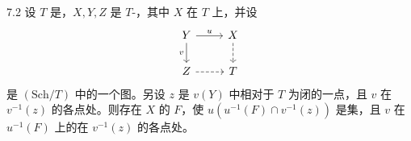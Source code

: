 \begin{SGAresult}{}{7.2}
设 $T$ 是，$X,Y,Z$ 是 $T$-，其中 $X$ 在 $T$ 上，并设
\[
\begin{tikzcd}
Y\arrow[r,"u"]\arrow[d,"v"']&X\arrow[d,dashed]\\
Z\arrow[r,dashed]&T
\end{tikzcd}
\]
是 $(\mathrm{Sch}/T)$ 中的一个图。另设 $z$ 是 $v(Y)$ 中相对于 $T$ 为闭的一点，且 $v$ 在 $v^{-1}(z)$ 的各点处。则存在 $X$ 的 $F$，使 $u(u^{-1}(F)\cap v^{-1}(z))$ 是集，且 $v$ 在 $u^{-1}(F)$ 上的在 $v^{-1}(z)$ 的各点处。
\end{SGAresult}
